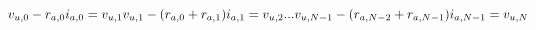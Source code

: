 \documentclass[10pt]{article}
\begin{document}
\[\hspace{-15pt}v_{u,0} - r_{a,0} i_{a,0} = v_{u,1} \\
v_{u,1} - (r_{a,0} + r_{a,1}) i_{a,1} = v_{u,2}  \\
...\\
v_{u,N-1} - (r_{a,N-2} + r_{a,N-1}) i_{a,N-1} = v_{u,N} \\
\]
\end{document}
